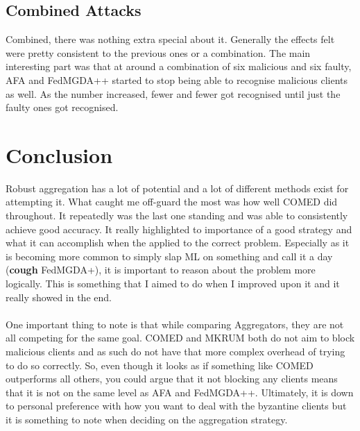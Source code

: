 \subsection{Combined Attacks}
Combined, there was nothing extra special about it.
Generally the effects felt were pretty consistent to the previous ones or a combination.
The main interesting part was that at around a combination of six malicious and six faulty, AFA and FedMGDA++ started to stop being able to recognise malicious clients as well.
As the number increased, fewer and fewer got recognised until just the faulty ones got recognised.

\section{Conclusion}
Robust aggregation has a lot of potential and a lot of different methods exist for attempting it.
What caught me off-guard the most was how well COMED did throughout.
It repeatedly was the last one standing and was able to consistently achieve good accuracy.
It really highlighted to importance of a good strategy and what it can accomplish when the applied to the correct problem.
Especially as it is becoming more common to simply slap ML on something and call it a day (\textbf{cough} FedMGDA+), it is important to reason about the problem more logically.
This is something that I aimed to do when I improved upon it and it really showed in the end.
\\ \\
One important thing to note is that while comparing Aggregators, they are not all competing for the same goal.
COMED and MKRUM both do not aim to block malicious clients and as such do not have that more complex overhead of trying to do so correctly.
So, even though it looks as if something like COMED outperforms all others, you could argue that it not blocking any clients means that it is not on the same level as AFA and FedMGDA++.
Ultimately, it is down to personal preference with how you want to deal with the byzantine clients but it is something to note when deciding on the aggregation strategy.